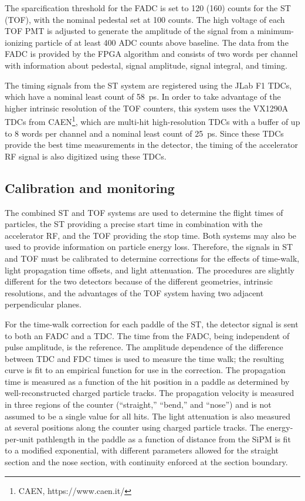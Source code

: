 The sparcification threshold for the FADC is set to 120 (160) counts for the ST (TOF), with the nominal pedestal set at 100 counts. The high voltage of each TOF PMT is adjusted to generate the amplitude of the signal from a minimum-ionizing particle of at least 400 ADC counts above baseline. The data from the FADC is provided by the FPGA algorithm and consists
of two words per channel with information about pedestal, signal amplitude, signal integral, and timing.

The timing signals from the ST system are registered using the JLab F1 TDCs, which have a nominal least count of 58~ps. In order to take advantage of the higher intrinsic resolution of the TOF counters, this system uses the VX1290A TDCs from CAEN\footnote{CAEN, https://www.caen.it/}, which are multi-hit high-resolution TDCs with a buffer of up to 8 words per channel and a nominal least count of 25~ps. Since these TDCs provide the best time measurements in the \gx{} detector, the timing of the accelerator RF signal is also
digitized using these TDCs.

\subsection{Calibration and monitoring \label{sec:sccalib}}
The combined ST and TOF systems are used to determine the flight times of particles, the ST providing a precise start time in combination with the accelerator RF, and the TOF providing the stop time. Both systems may also be used to provide information on particle energy loss. Therefore, the signals in ST and TOF must be 
calibrated to determine corrections for the effects of
time-walk, light propagation time offsets, and light attenuation. The procedures are slightly different for the two detectors because of the different geometries, intrinsic resolutions, and the advantages of the TOF system having two adjacent perpendicular planes. 

For the time-walk correction for each paddle of the ST, the detector signal is sent to both an FADC and a TDC. The time from the FADC, being independent of pulse amplitude, is the reference. The amplitude dependence of the difference between TDC and FDC times is used to measure the time walk; the resulting curve is fit to an empirical function for use in the correction. 
The propagation time is measured as a function of the hit position in a paddle as determined by well-reconstructed charged particle tracks. The propagation velocity is measured in three regions of the counter (``straight,'' ``bend,'' and ``nose'') and is not assumed to be a single value for all hits. The light attenuation is also measured at several positions along the counter using charged particle tracks. The energy-per-unit pathlength in the paddle as a function of distance from the SiPM is fit to a modified exponential, with different parameters allowed for the straight section and the nose section, with continuity enforced at the section boundary.

